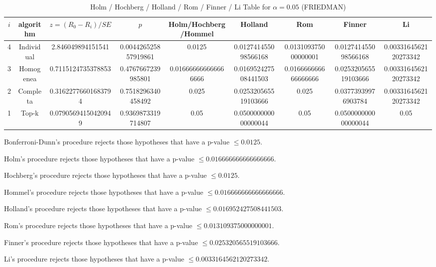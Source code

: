\documentclass[a4paper,10pt]{article}
\begin{document}
\begin{landscape}
\begin{table}[!htp]
\centering\scriptsize
\caption{Holm / Hochberg / Holland / Rom / Finner / Li Table for $\alpha=0.05$ (FRIEDMAN)}
\begin{tabular}{ccccccccc}
$i$&algorithm&$z=(R_0 - R_i)/SE$&$p$&Holm/Hochberg/Hommel&Holland&Rom&Finner&Li\\
\hline
4&Individual&2.846049894151541&0.004426525857919861&0.0125&0.012741455098566168&0.013109375000000001&0.012741455098566168&0.0033164562120273342\\
3&Homogenea&0.7115124735378853&0.4767667239985801&0.016666666666666666&0.016952427508441503&0.016666666666666666&0.025320565519103666&0.0033164562120273342\\
2&Completa&0.31622776601683794&0.7518296340458492&0.025&0.025320565519103666&0.025&0.03773939976903784&0.0033164562120273342\\
1&Top-k&0.07905694150420949&0.9369873319714807&0.05&0.050000000000000044&0.05&0.050000000000000044&0.05\\
\hline
\end{tabular}
\end{table}
Bonferroni-Dunn's procedure rejects those hypotheses that have a p-value $\le0.0125$.


Holm's procedure rejects those hypotheses that have a p-value $\le0.016666666666666666$.


Hochberg's procedure rejects those hypotheses that have a p-value $\le0.0125$.


Hommel's procedure rejects those hypotheses that have a p-value $\le0.016666666666666666$.


Holland's procedure rejects those hypotheses that have a p-value $\le0.016952427508441503$.


Rom's procedure rejects those hypotheses that have a p-value $\le0.013109375000000001$.


Finner's procedure rejects those hypotheses that have a p-value $\le0.025320565519103666$.


Li's procedure rejects those hypotheses that have a p-value $\le0.0033164562120273342$.



\newpage


\end{landscape}
\end{document}

